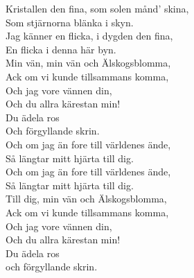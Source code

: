 \documentclass[a6paper,10pt]{article}
\begin{document}
\setlength{\oddsidemargin}{-0.47in}
\noindent
\begin{center}
\end{center}
\begin{lyrics}
Kristallen den fina, som solen månd' skina,\\
Som stjärnorna blänka i skyn.\\
Jag känner en flicka, i dygden den fina,\\
En flicka i denna här byn.
\vspace{5pt}\\
Min vän, min vän och Älskogsblomma,\\
Ack om vi kunde tillsammans komma,\\
Och jag vore vännen din,\\
Och du allra kärestan min!\\
Du ädela ros\\
Och förgyllande skrin.
\vspace{5pt}\\
Och om jag än fore till världenes ände,\\
Så längtar mitt hjärta till dig.\\
Och om jag än fore till världenes ände,\\
Så längtar mitt hjärta till dig.
\vspace{5pt}\\
Till dig, min vän och Älskogsblomma,\\
Ack om vi kunde tillsammans komma,\\
Och jag vore vännen din,\\
Och du allra kärestan min!\\
Du ädela ros\\
och förgyllande skrin. 
\end{lyrics}
\end{document}
